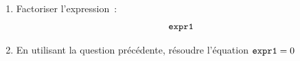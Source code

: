 \documentclass[exercice]{thedocument}%
\begin{document}
%
\begin{enumerate}
    \item Factoriser l'expression~:$$\<expr1;$$
    \item En utilisant la question précédente, résoudre l'équation
    $\<expr1;=0$
\end{enumerate}
\end{document}
